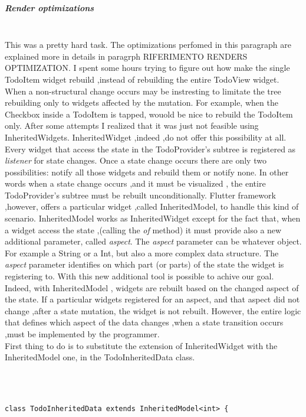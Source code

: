\subparagraph{Render optimizations} \mbox{} \\
\label{subpar:render_optimizations_inherited_widget}
This was a pretty hard task. The optimizations perfomed in this paragraph are explained more in details in paragrph RIFERIMENTO RENDERS OPTIMIZATION. I spent some hours trying to figure out how make the single TodoItem widget rebuild ,instead of rebuilding the entire TodoView widget. When a non-structural change occurs may be instresting to limitate the tree rebuilding only to widgets affected by the mutation. For example, when the Checkbox inside a TodoItem is tapped, wouold be nice to rebuild the TodoItem only. After some attempts I realized that it was just not feasible using InheritedWidgets. InheritedWidget ,indeed ,do not offer this possibility at all. Every widget that access the state in the TodoProvider’s subtree is registered as \textit{listener} for state changes. Once a state change occurs there are only two possibilities: notify all those widgets and rebuild them or notify none. In other words when a state change occurs ,and it must be visualized , the entire TodoProvider’s subtree must be rebuilt unconditionally. Flutter framework ,however, offers a particular widget ,called InheritedModel, to handle this kind of scenario. InheritedModel works as InheritedWidget except for the fact that, when a widget access the state ,(calling the \textit{of} method) it must provide also a new additional parameter, called \textit{aspect}. The \textit{aspect} parameter can be whatever object. For example a String or a Int, but also a more complex data structure. The \textit{aspect} parameter identifies on which part (or parts) of the state the widget is registering to. 
With this new additional tool is possible to achive our goal. Indeed, with InheritedModel , widgets are rebuilt based on the changed aspect of the state. If a particular widgets registered for an aspect, and that aspect did not change ,after a state mutation, the widget is not rebuilt. However, the entire logic that defines which aspect of the data changes ,when a state transition occurs ,must be implemented by the programmer.\\
First thing to do is to substitute the extension of InheritedWidget with the InheritedModel one, in the
TodoInheritedData class.
\mbox{}\\
\begin{code}

\mbox{}\\
\begin{verbatim}

class TodoInheritedData extends InheritedModel<int> {
\end{verbatim}
\end{code}
